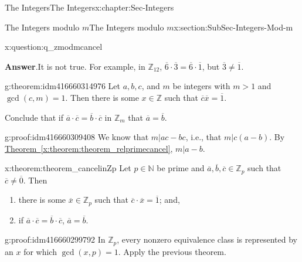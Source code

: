 \documentclass[oneside,10pt,]{book}
\numberwithin{equation}{section}
\def\Z{{\mathbb Z}}
\def\N{{\mathbb N}}
\begin{document}
\begin{chapterptx}{The Integers}{}{The Integers}{}{}{x:chapter:Sec-Integers}
\begin{sectionptx}{The Integers modulo \(m\)}{}{The Integers modulo \(m\)}{}{}{x:section:SubSec-Integers-Mod-m}
\begin{question}{}{x:question:q_zmodmcancel}
\par\smallskip%
\noindent\textbf{Answer}.\hypertarget{g:answer:idm416660317328}{}\quad{}It is not true. For example, in \(\Z_{12}\), \(\overline{6}\cdot \overline{3} = \overline{6}\cdot\overline{1}\), but \(\overline{3}\ne \overline{1}\).%
\end{question}
\begin{theorem}{}{}{g:theorem:idm416660314976}%
Let \(a,b,c\), and \(m\) be integers with \(m > 1\) and \(\gcd(c,m)=1\). Then there is some \(x\in \Z\) such that \(\overline{c} \overline{x} = \overline{1}\).%
\par
Conclude that if \(\overline{a} \cdot\overline{c} = \overline{b}\cdot\overline{c}\) in \(\Z_m\) that \(\overline{a} = \overline{b}\).%
\end{theorem}
\begin{proofptx}{}{g:proof:idm416660309408}
We know that \(m|ac-bc\), i.e., that \(m|c(a-b)\). By \hyperref[x:theorem:theorem_relprimecancel]{Theorem~\ref{x:theorem:theorem_relprimecancel}}, \(m|a-b\).%
\end{proofptx}
\begin{theorem}{}{}{x:theorem:theorem_cancelinZp}%
Let \(p\in \N\) be prime and \(\overline{a},\overline{b},\overline{c}\in \Z_p\) such that \(\overline{c}\ne \overline{0}\). Then%
\begin{enumerate}
\item{}there is some \(\overline{x}\in \Z_p\) such that \(\overline{c}\cdot \overline{x} = \overline{1}\); and,%
\item{}if \(\overline{a} \cdot\overline{c} = \overline{b}\cdot\overline{c}\), \(\overline{a} = \overline{b}\).%
\end{enumerate}
%
\end{theorem}
\begin{proofptx}{}{g:proof:idm416660299792}
In \(\Z_p\), every nonzero equivalence class is represented by an \(x\) for which \(\gcd(x,p) = 1\). Apply the previous theorem.%
\end{proofptx}
\end{sectionptx}
\end{chapterptx}
%
%
\typeout{************************************************}
\typeout{************************************************}
%
\end{document}
